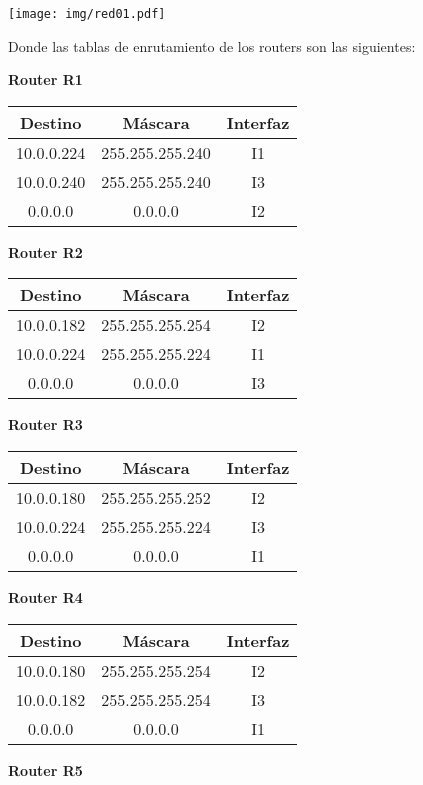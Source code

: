 \documentclass[12pt]{article}
\begin{document}
    \texttt{[image: img/red01.pdf]}

Donde las tablas de enrutamiento de los routers son las siguientes:

\textbf{Router R1}

\begin{tabular}{|c|c|c|}
    \hline
    Destino & Máscara & Interfaz \\
    \hline
    10.0.0.224 & 255.255.255.240 & I1 \\
    \hline
    10.0.0.240 & 255.255.255.240 & I3 \\
    \hline
    0.0.0.0 & 0.0.0.0 & I2 \\
    \hline
\end{tabular}

\textbf{Router R2}

\begin{tabular}{|c|c|c|}
    \hline
    Destino & Máscara & Interfaz \\
    \hline
    10.0.0.182 & 255.255.255.254 & I2 \\
    \hline
    10.0.0.224 & 255.255.255.224 & I1 \\
    \hline
    0.0.0.0 & 0.0.0.0 & I3 \\
    \hline
\end{tabular}

\textbf{Router R3}

\begin{tabular}{|c|c|c|}
    \hline
    Destino & Máscara & Interfaz \\
    \hline
    10.0.0.180 & 255.255.255.252 & I2 \\
    \hline
    10.0.0.224 & 255.255.255.224 & I3 \\
    \hline
    0.0.0.0 & 0.0.0.0 & I1 \\
    \hline
\end{tabular}

\textbf{Router R4}

\begin{tabular}{|c|c|c|}
    \hline
    Destino & Máscara & Interfaz \\
    \hline
    10.0.0.180 & 255.255.255.254 & I2 \\
    \hline
    10.0.0.182 & 255.255.255.254 & I3 \\
    \hline
    0.0.0.0 & 0.0.0.0 & I1 \\
    \hline
\end{tabular}

\textbf{Router R5}
\end{document}
